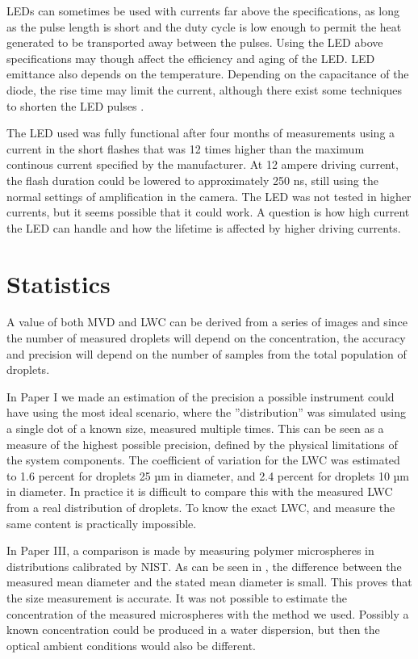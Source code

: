 LEDs can sometimes be used with currents far above the specifications, as long as the pulse length is short and the duty cycle is low enough to permit the heat generated to be transported away between the pulses. Using the LED above specifications may though affect the efficiency and aging of the LED. LED emittance also depends on the temperature. Depending on the capacitance of the diode, the rise time may limit the current, although there exist some techniques to shorten the LED pulses \cite{tanaka2011,vele2007}.

The LED used was fully functional after four months of measurements using a current in the short flashes that was 12 times higher than the maximum continous current specified by the manufacturer. At 12 ampere driving current, the flash duration could be lowered to approximately 250 ns, still using the normal settings of amplification in the camera. The LED was not tested in higher currents, but it seems possible that it could work. A question is how high current the LED can handle and how the lifetime is affected by higher driving currents.

\section{Statistics}

A value of both MVD and LWC can be derived from a series of images and since the number of measured droplets will depend on the concentration, the accuracy and precision will depend on the number of samples from the total population of droplets. 

In Paper I we made an estimation of the precision a possible instrument could have using the most ideal scenario, where the ''distribution'' was simulated using a single dot of a known size, measured multiple times. This can be seen as a measure of the highest possible precision, defined by the physical limitations of the system components. The coefficient of variation for the LWC was estimated to 1.6 percent for droplets 25 µm in diameter, and 2.4 percent for droplets 10 µm in diameter. In practice it is difficult to compare this with the measured LWC from a real  distribution of droplets. To know the exact LWC, and measure the same content is practically impossible. 

In Paper III, a comparison is made by measuring polymer microspheres in distributions calibrated by NIST. As can be seen in , the difference between the measured mean diameter and the stated mean diameter is small. This proves that the size measurement is accurate. It was not possible to estimate the concentration of the measured microspheres with the method we used. Possibly a known concentration could be produced in a water dispersion, but then the optical ambient conditions would also be different.



